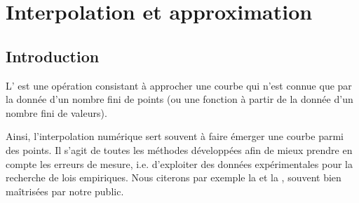 \chapter{Interpolation et approximation}\label{chap-interpolation}


\medskip
\section{Introduction}

L' est une opération consistant à approcher une courbe qui n'est connue que 
par la donnée d'un nombre fini de points (ou une fonction à partir de la donnée d'un nombre fini de valeurs). 

Ainsi, l'interpolation numérique sert souvent à \og faire émerger une courbe parmi des points\fg{}.
Il s'agit de toutes les méthodes développées afin de mieux prendre en compte les erreurs de mesure, i.e.
d'exploiter des données expérimentales pour la recherche de lois empiriques. 
Nous citerons par exemple la  et la 
, souvent bien maîtrisées par notre public.

